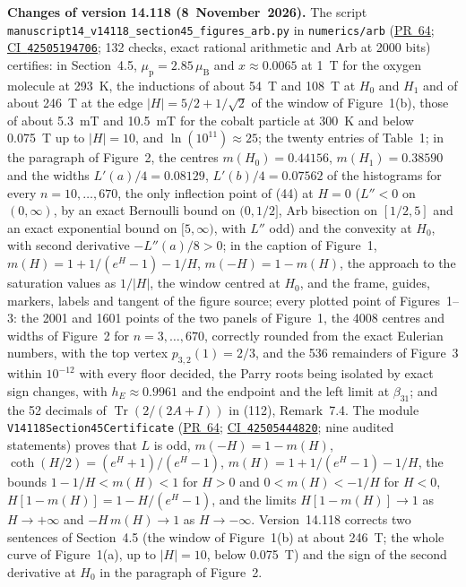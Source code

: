 \documentclass[11pt,a4paper]{article}
\newcommand{\R}{https://github.com/ralfanop/Certifications_Eulerian_polar-curve_computations}
\newcommand{\PR}[1]{\href{\R/pull/#1}{PR~#1}}
\newcommand{\CI}[1]{\href{\R/actions/runs/#1}{CI~\texttt{#1}}}
\newcommand{\eq}[1]{(#1)}
\begin{document}
\textbf{Changes of version 14.118 (8~November~2026).} The script \texttt{manuscript14\_\allowbreak v14118\_\allowbreak section45\_\allowbreak figures\_\allowbreak arb.py} in \texttt{numerics/\allowbreak arb} (\PR{64}; \CI{42505194706}; 132 checks, exact rational arithmetic and Arb at 2000 bits) certifies: in Section~4.5, $\mu_{\mathrm p}=2.85\,\mu_{\mathrm B}$ and $x\approx0.0065$ at 1~T for the oxygen molecule at 293~K, the inductions of about 54~T and 108~T at $H_0$ and $H_1$ and of about 246~T at the edge $|H|=5/2+1/\sqrt2$ of the window of Figure~1(b), those of about 5.3~mT and 10.5~mT for the cobalt particle at 300~K and below 0.075~T up to $|H|=10$, and $\ln(10^{11})\approx25$; the twenty entries of Table~1; in the paragraph of Figure~2, the centres $m(H_0)=0.44156$, $m(H_1)=0.38590$ and the widths $L'(a)/4=0.08129$, $L'(b)/4=0.07562$ of the histograms for every $n=10,\ldots,670$, the only inflection point of \eq{44} at $H=0$ ($L''<0$ on $(0,\infty)$, by an exact Bernoulli bound on $(0,1/2]$, Arb bisection on $[1/2,5]$ and an exact exponential bound on $[5,\infty)$, with $L''$ odd) and the convexity at $H_0$, with second derivative $-L''(a)/8>0$; in the caption of Figure~1, $m(H)=1+1/(e^H-1)-1/H$, $m(-H)=1-m(H)$, the approach to the saturation values as $1/|H|$, the window centred at $H_0$, and the frame, guides, markers, labels and tangent of the figure source; every plotted point of Figures~1--3: the 2001 and 1601 points of the two panels of Figure~1, the 4008 centres and widths of Figure~2 for $n=3,\ldots,670$, correctly rounded from the exact Eulerian numbers, with the top vertex $p_{3,2}(1)=2/3$, and the 536 remainders of Figure~3 within $10^{-12}$ with every floor decided, the Parry roots being isolated by exact sign changes, with $h_E\approx0.9961$ and the endpoint and the left limit at $\beta_{31}$; and the 52 decimals of $\operatorname{Tr}(2/(2A+I))$ in \eq{112}, Remark~7.4. The module \texttt{V14118Section45Certificate} (\PR{64}; \CI{42505444820}; nine audited statements) proves that $L$ is odd, $m(-H)=1-m(H)$, $\coth(H/2)=(e^H+1)/(e^H-1)$, $m(H)=1+1/(e^H-1)-1/H$, the bounds $1-1/H<m(H)<1$ for $H>0$ and $0<m(H)<-1/H$ for $H<0$, $H[1-m(H)]=1-H/(e^H-1)$, and the limits $H[1-m(H)]\to1$ as $H\to+\infty$ and $-H\,m(H)\to1$ as $H\to-\infty$. Version~14.118 corrects two sentences of Section~4.5 (the window of Figure~1(b) at about 246~T; the whole curve of Figure~1(a), up to $|H|=10$, below 0.075~T) and the sign of the second derivative at $H_0$ in the paragraph of Figure~2.
\end{document}
